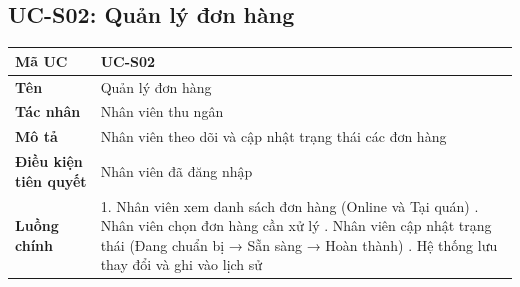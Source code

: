 \documentclass[../20232006p.tex]{subfiles}
\begin{document}
\subsection{UC-S02: Quản lý đơn hàng}
\begin{table}[H]
    \centering
    \begin{tabular}{|p{3.5cm}|p{10cm}|}
        \hline
        \textbf{Mã UC}                & UC-S02                                                 \\
        \hline
        \textbf{Tên}                  & Quản lý đơn hàng                                       \\
        \hline
        \textbf{Tác nhân}             & Nhân viên thu ngân                                     \\
        \hline
        \textbf{Mô tả}                & Nhân viên theo dõi và cập nhật trạng thái các đơn hàng \\
        \hline
        \textbf{Điều kiện tiên quyết} & Nhân viên đã đăng nhập                                 \\
        \hline
        \textbf{Luồng chính}          &
        1. Nhân viên xem danh sách đơn hàng (Online và Tại quán) \newline
        2. Nhân viên chọn đơn hàng cần xử lý \newline
        3. Nhân viên cập nhật trạng thái (Đang chuẩn bị → Sẵn sàng → Hoàn thành) \newline
        4. Hệ thống lưu thay đổi và ghi vào lịch sử                                            \\
        \hline
    \end{tabular}
\end{table}
\end{document}
